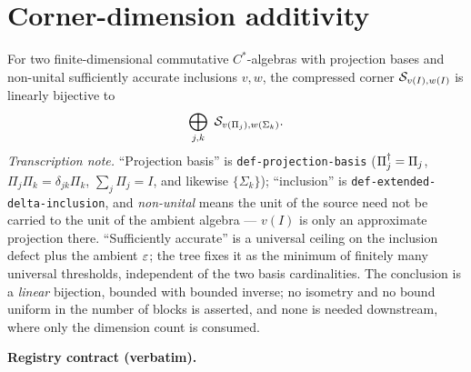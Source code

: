 \section{Corner-dimension additivity}\label{sec:extcb-corner-dimension-additivity}

\begin{lemma}\label{lem:extcb-corner-dimension-additivity}
For two finite-dimensional commutative $C^*$-algebras with projection bases and
non-unital sufficiently accurate inclusions $v,w$, the compressed corner
$\mathcal S_{v(I),w(I)}$ is linearly bijective to
\begin{equation}\label{eq:add-main}
  \bigoplus_{j,k}\ \mathcal S_{v(\Pi_j),w(\Sigma_k)} .
\end{equation}
\emph{Transcription note.} ``Projection basis'' is \texttt{def-projection-basis}
($\Pi_j^{\dagger}=\Pi_j$, $\Pi_j\Pi_k=\delta_{jk}\Pi_k$, $\sum_j\Pi_j=I$, and likewise
$\{\Sigma_k\}$); ``inclusion'' is \texttt{def-extended-delta-inclusion}, and
\emph{non-unital} means the unit of the source need not be carried to the unit of the
ambient algebra --- $v(I)$ is only an approximate projection there. ``Sufficiently
accurate'' is a universal ceiling on the inclusion defect plus the ambient $\varepsilon$; the
tree fixes it as the minimum of finitely many universal thresholds, independent of the
two basis cardinalities. The conclusion is a \emph{linear} bijection, bounded with bounded
inverse; no isometry and no bound uniform in the number of blocks is asserted, and none is
needed downstream, where only the dimension count is consumed.
\end{lemma}

\noindent\textbf{Registry contract (verbatim).}

